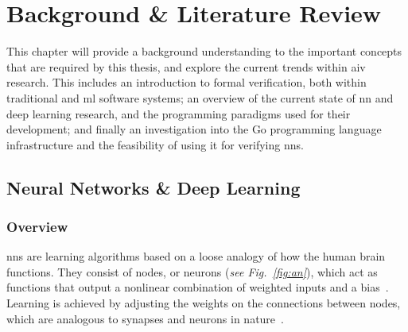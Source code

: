 
\chapter{Background \& Literature Review}\label{Chapter2}


This chapter will provide a background understanding to the important concepts that are required by this thesis, and explore the
current trends within \Gls{aiv} research.
This includes an introduction to formal verification, both within traditional and \gls{ml} software systems; an overview of the
current state of \Gls{nn} and deep learning research, and the programming paradigms used for their development; and finally an 
investigation into the Go programming language infrastructure and the feasibility of using it for verifying \glspl{nn}.

\section{Neural Networks \& Deep Learning}


\subsection{Overview}

\glspl{nn} are learning algorithms based on a loose analogy of how the
human brain functions. They consist of nodes, or neurons
(\textit{see Fig.~\ref{fig:an}}), which act as functions that output a
nonlinear combination of weighted inputs and a bias~\citep{Dreyfus2005}.
Learning is achieved by adjusting the weights on the connections between
nodes, which are analogous to synapses and neurons in nature~\citep{Sammut2010}.

